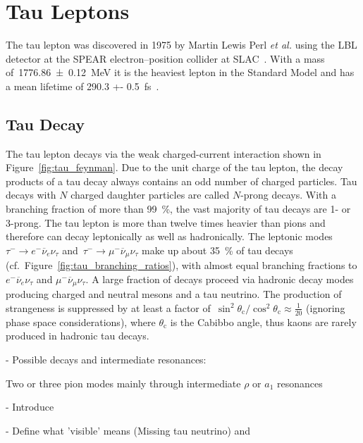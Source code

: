 \section{Tau Leptons}

The tau lepton was discovered in 1975 by Martin Lewis Perl \textit{et al.} using
the LBL detector at the SPEAR electron--position collider at SLAC~\cite{perl}.
With a mass of~\SI{1776.86 +- 0.12}{\MeV} it is the heaviest lepton in the
Standard Model and has a mean lifetime of \SI{290.3 +-
  0.5}{\femto\second}~\cite{pdg}.

\subsection{Tau Decay}

The tau lepton decays via the weak charged-current interaction shown in
Figure~\ref{fig:tau_feynman}. Due to the unit charge of the tau lepton, the
decay products of a tau decay always contains an odd number of charged
particles. Tau decays with $N$ charged daughter particles are called $N$-prong
decays. With a branching fraction of more than \SI{99}{\percent}, the vast
majority of tau decays are 1- or 3-prong. The tau lepton is more than twelve
times heavier than pions and therefore can decay leptonically as well as
hadronically. The leptonic modes~$\tau^- \to e^- \overline{\nu}_e \nu_\tau$
and~$\tau^- \to \mu^- \overline{\nu}_\mu \nu_\tau$ make up about
\SI{35}{\percent} of tau decays (cf.\ Figure~\ref{fig:tau_branching_ratios}),
with almost equal branching fractions to $e^- \overline{\nu}_e \nu_\tau$ and
$\mu^- \overline{\nu}_\mu \nu_\tau$. A large fraction of decays proceed via
hadronic decay modes producing charged and neutral mesons and a tau neutrino.
The production of strangeness is suppressed by at least a factor
of~$\sin^2\theta_\text{c} / \cos^2\theta_\text{c} \approx \frac{1}{20}$
(ignoring phase space considerations), where $\theta_\text{c}$ is the Cabibbo
angle, thus kaons are rarely produced in hadronic tau decays.



- Possible decays and intermediate resonances:

Two or three pion modes mainly through intermediate $\rho$ or $a_1$
  resonances


- Introduce \tauhad

- Define what 'visible' means (Missing tau neutrino) and \tauhadvis



